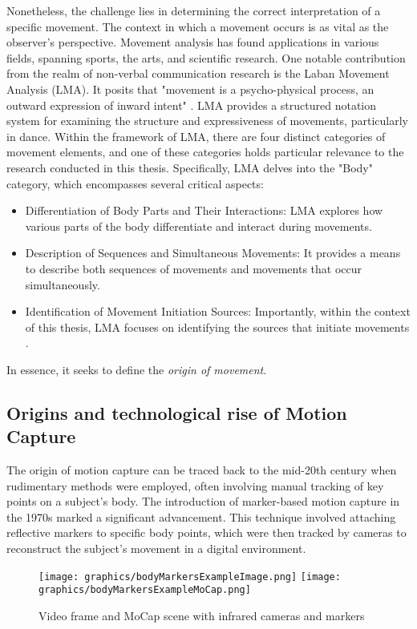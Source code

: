 Nonetheless, the challenge lies in determining the correct interpretation of a specific movement. 
The context in which a movement occurs is as vital as the observer's perspective. 
Movement analysis has found applications in various fields, spanning sports, the arts, and scientific research. 
One notable contribution from the realm of non-verbal communication research is the Laban Movement Analysis (LMA). 
It posits that "movement is a psycho-physical process, an outward expression of inward intent" \cite{Groff1995LabanMA}. 
LMA provides a structured notation system for examining the structure and expressiveness of movements, particularly in dance.
Within the framework of LMA, there are four distinct categories of movement elements, and one of these categories holds particular relevance to the research conducted in this thesis. 
Specifically, LMA delves into the "Body" category, which encompasses several critical aspects:
\begin{itemize}
    \item Differentiation of Body Parts and Their Interactions: LMA explores how various parts of the body differentiate and interact during movements.
    \item Description of Sequences and Simultaneous Movements: It provides a means to describe both sequences of movements and movements that occur simultaneously.  
    \item Identification of Movement Initiation Sources: Importantly, within the context of this thesis, LMA focuses on identifying the sources that initiate movements \cite{zhao2001synthesis}.
\end{itemize}
In essence, it seeks to define the \textit{origin of movement}.
    
\subsection{Origins and technological rise of Motion Capture}
The origin of motion capture can be traced back to the mid-20th century when rudimentary methods were employed, 
often involving manual tracking of key points on a subject's body. 
The introduction of marker-based motion capture in the 1970s marked a significant advancement. 
This technique involved attaching reflective markers to specific body points, 
which were then tracked by cameras to reconstruct the subject's movement in a digital environment. 
\begin{figure}[H]
    \centering
    \texttt{[image: graphics/bodyMarkersExampleImage.png]}
    \texttt{[image: graphics/bodyMarkersExampleMoCap.png]}
    \caption{Video frame and MoCap scene with infrared cameras and markers}
    \label{fig:common}
\end{figure}

